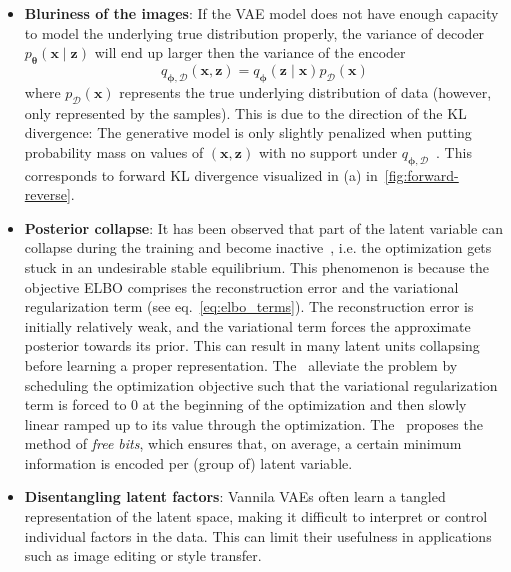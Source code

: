 \begin{itemize}
    \item \textbf{Bluriness of the images}: If the VAE model does not have enough capacity to model the underlying true distribution properly,
    the variance of decoder $p_{\boldsymbol{\theta}}(\boldsymbol{x}\mid \boldsymbol{z})$ will end up larger then the variance of the encoder 
    $$
    q_{\mathbf{\phi},\mathcal{D}}(\boldsymbol{x},\boldsymbol{z}) = q_{\boldsymbol{\phi}}(\mathbf{z}\mid\mathbf{x})p_{\mathcal{D}}(\mathbf{x})
    $$
    where $p_{\mathcal{D}}(\mathbf{x})$ represents the true underlying distribution of data (however, only represented by the samples).
    This is due to the direction of the KL divergence: The generative model is only slightly penalized when putting probability mass on values 
    of $(\boldsymbol{x},\boldsymbol{z})$ with no support under $q_{\mathbf{\phi},\mathcal{D}}$~\cite{intro-vae-2019}. This corresponds to forward KL
    divergence visualized in (a) in~\ref{fig:forward-reverse}. \label{item:blurriness-of-img}

    \item \textbf{Posterior collapse}: It has been observed that part of the latent variable can collapse during the training and become
    inactive~\cite{lvae-2016,iaf-2016,bowmann-2016}, i.e. the optimization gets stuck in an undesirable stable
    equilibrium. This phenomenon is because the objective ELBO comprises the reconstruction error and the variational regularization
    term (see eq.~\ref{eq:elbo_terms}). The reconstruction error is initially relatively weak, and
    the variational term forces the approximate posterior towards its prior. This can result in many latent units collapsing before learning a proper representation. 
    The~\cite{lvae-2016} alleviate the problem by scheduling the optimization objective such that the variational regularization term is
    forced to 0 at the beginning of the optimization and then slowly linear ramped up to its value through the optimization. The~\cite{iaf-2016} 
    proposes the method of \textit{free bits}, which ensures that, on average, a certain minimum information is encoded per (group of) 
    latent variable. 
    \item \textbf{Disentangling latent factors}: Vannila VAEs often learn a tangled representation of the latent space, making it
    difficult to interpret or control individual factors in the data. This can limit their usefulness in applications such as 
    image editing or style transfer.
\end{itemize}

